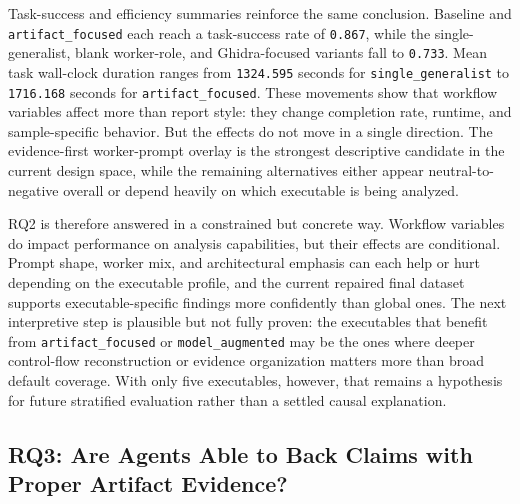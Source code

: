 Task-success and efficiency summaries reinforce the same conclusion. Baseline and \texttt{artifact\_focused} each reach a task-success rate of \texttt{0.867}, while the single-generalist, blank worker-role, and Ghidra-focused variants fall to \texttt{0.733}. Mean task wall-clock duration ranges from \texttt{1324.595} seconds for \texttt{single\_generalist} to \texttt{1716.168} seconds for \texttt{artifact\_focused}. These movements show that workflow variables affect more than report style: they change completion rate, runtime, and sample-specific behavior. But the effects do not move in a single direction. The evidence-first worker-prompt overlay is the strongest descriptive candidate in the current design space, while the remaining alternatives either appear neutral-to-negative overall or depend heavily on which executable is being analyzed.

RQ2 is therefore answered in a constrained but concrete way. Workflow variables do impact performance on analysis capabilities, but their effects are conditional. Prompt shape, worker mix, and architectural emphasis can each help or hurt depending on the executable profile, and the current repaired final dataset supports executable-specific findings more confidently than global ones. The next interpretive step is plausible but not fully proven: the executables that benefit from \texttt{artifact\_focused} or \texttt{model\_augmented} may be the ones where deeper control-flow reconstruction or evidence organization matters more than broad default coverage. With only five executables, however, that remains a hypothesis for future stratified evaluation rather than a settled causal explanation.

\subsection[RQ3: Artifact-Backed Claims]{RQ3: Are Agents Able to Back Claims with Proper Artifact Evidence?}

